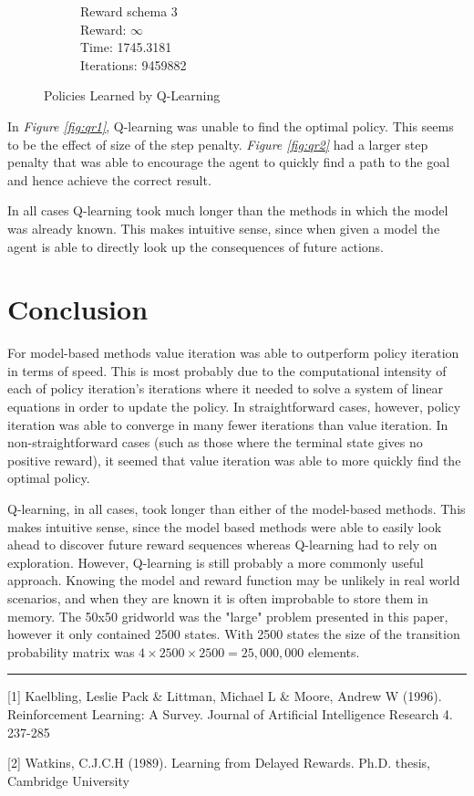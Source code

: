\documentclass[a4paper,10pt]{article}
\begin{document}
\begin{figure}[H]
\begin{subfigure}[b]{0.3\textwidth}
                \caption{Reward schema 3 \\
                Reward: $\infty$\\
                Time: 1745.3181 \\
                Iterations: 9459882 }
                \label{fig:mouse}
        \end{subfigure}
        \caption{Policies Learned by Q-Learning}\label{fig:animals}
\end{figure}

In \textit{Figure \ref{fig:qr1}}, Q-learning was unable to find the optimal policy. This seems to be the effect of size of the step penalty. \textit{Figure \ref{fig:qr2}} had a larger step penalty that was able to encourage the agent to quickly find a path to the goal and hence achieve the correct result.

In all cases Q-learning took much longer than the methods in which the model was already known. This makes intuitive sense, since when given a model the agent is able to directly look up the consequences of future actions. 

\section{Conclusion}

For model-based methods value iteration was able to outperform policy iteration in terms of speed. This is most probably due to the computational intensity of each of policy iteration's iterations where it needed to solve a system of linear equations in order to update the policy. In straightforward cases, however, policy iteration was able to converge in many fewer iterations than value iteration. In non-straightforward cases (such as those where the terminal state gives no positive reward), it seemed that value iteration was able to more quickly find the optimal policy.

Q-learning, in all cases, took longer than either of the model-based methods. This makes intuitive sense, since the model based methods were able to easily look ahead to discover future reward sequences whereas Q-learning had to rely on exploration. However, Q-learning is still probably a more commonly useful approach. Knowing the model and reward function may be unlikely in real world scenarios, and when they are known it is often improbable to store them in memory. The 50x50 gridworld was the "large" problem presented in this paper, however it  only contained 2500 states. With 2500 states the size of the transition probability matrix was $4\times2500\times2500 = 25,000,000 $ elements. 

\begin{center}
\noindent\rule{8cm}{0.4pt}
\end{center}

[1] Kaelbling, Leslie Pack \& Littman, Michael L \& Moore, Andrew W (1996). Reinforcement Learning: A Survey. Journal of Artificial Intelligence Research 4. 237-285

[2] Watkins, C.J.C.H (1989). Learning from Delayed Rewards. Ph.D. thesis, Cambridge University
\end{document}
